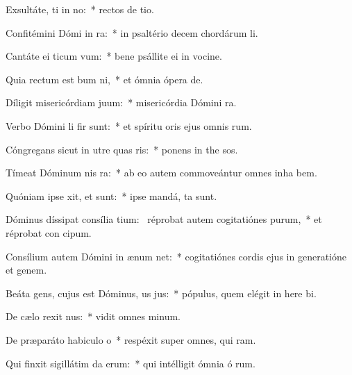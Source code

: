 \item Exsultáte, ti in no:~* rectos de tio.
\item Confitémini Dómi in ra:~* in psaltério decem chordárum  li.
\item Cantáte ei ticum vum:~* bene psállite ei in vocine.
\item Quia rectum est bum ni,~* et ómnia ópera   de.
\item Díligit misericórdiam  juum:~* misericórdia Dómini   ra.
\item Verbo Dómini li fir sunt:~* et spíritu oris ejus omnis  rum.
\item Cóngregans sicut in utre quas ris:~* ponens in the sos.
\item Tímeat Dóminum nis ra:~* ab eo autem commoveántur omnes inha bem.
\item Quóniam ipse xit, et  sunt:~* ipse mandá,  ta sunt.
\item Dóminus díssipat consília tium:~\pscross{} réprobat autem cogitatiónes purum,~* et réprobat con cipum.
\item Consílium autem Dómini in ænum net:~* cogitatiónes cordis ejus in generatióne et genem.
\item Beáta gens, cujus est Dóminus, us jus:~* pópulus, quem elégit in here bi.
\item De cælo rexit nus:~* vidit omnes  minum.
\item De præparáto habiculo o~* respéxit super omnes, qui  ram.
\item Qui finxit sigillátim da erum:~* qui intélligit ómnia ó rum.
